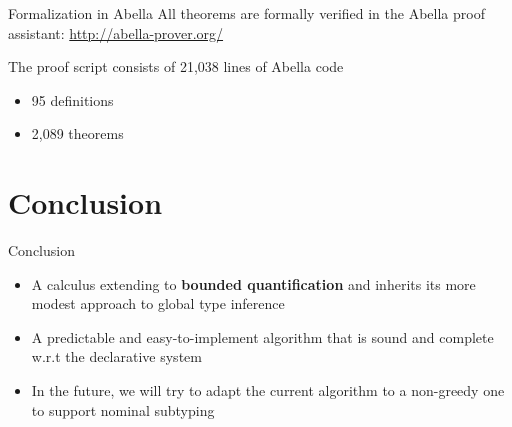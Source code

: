 \documentclass[aspectratio=169,10pt]{beamer}
\begin{document}
\begin{frame}[fragile]{Formalization in Abella}
    All theorems are formally verified in the Abella proof assistant: \url{http://abella-prover.org/}

    The proof script consists of 21,038 lines of Abella code
    \begin{itemize}
        \item 95 definitions
        \item 2,089 theorems
    \end{itemize}
\end{frame}

\section{Conclusion}

\begin{frame}[fragile]{Conclusion}
    \begin{itemize}
        \item A calculus extending \elementary to \textbf{bounded quantification} and inherits its more modest approach to global type inference
        \item A predictable and easy-to-implement algorithm that is sound and complete w.r.t the declarative system
        \item In the future, we will try to adapt the current algorithm to a non-greedy one to support nominal subtyping
    \end{itemize}
\end{frame}
\end{document}
